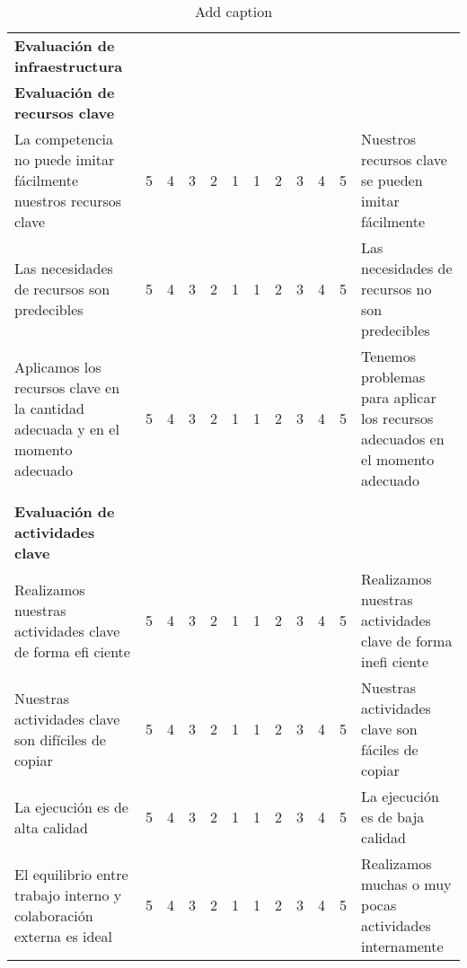\documentclass[11pt]{book}
\begin{document}
\begin{table}[htbp]
  \centering
  \caption{Add caption}
    \begin{tabular}{p{14.285em}ccccc|cccccp{12em}}
    \multicolumn{1}{l}{\textcolor[rgb]{ 1,  0,  0}{\textbf{Evaluación de infraestructura}}} &       &       &       &       & \multicolumn{1}{c}{} &       &       &       &       &       & \multicolumn{1}{r}{} \\
    \multicolumn{1}{l}{\textbf{Evaluación de recursos clave}} &       &       &       &       & \multicolumn{1}{c}{} &       &       &       &       &       & \multicolumn{1}{r}{} \\
    La competencia no puede imitar fácilmente nuestros recursos clave & 5     & 4     & 3     & 2     & 1     & 1     & 2     & 3     & 4     & 5     & Nuestros recursos clave se pueden imitar fácilmente \\
    Las necesidades de recursos son predecibles & 5     & 4     & 3     & 2     & 1     & 1     & 2     & 3     & 4     & 5     & Las necesidades de recursos no son predecibles \\
    Aplicamos los recursos clave en la cantidad adecuada y en el momento adecuado & 5     & 4     & 3     & 2     & 1     & 1     & 2     & 3     & 4     & 5     & Tenemos problemas para aplicar los recursos adecuados en el momento adecuado \\
    \multicolumn{1}{r}{} &       &       &       &       & \multicolumn{1}{c}{} &       &       &       &       &       & \multicolumn{1}{r}{} \\
    \multicolumn{1}{l}{\textbf{Evaluación de actividades clave}} &       &       &       &       & \multicolumn{1}{c}{} &       &       &       &       &       & \multicolumn{1}{r}{} \\
    Realizamos nuestras actividades clave de forma efi ciente & 5     & 4     & 3     & 2     & 1     & 1     & 2     & 3     & 4     & 5     & Realizamos nuestras actividades clave de forma inefi ciente \\
    Nuestras actividades clave son difíciles de copiar & 5     & 4     & 3     & 2     & 1     & 1     & 2     & 3     & 4     & 5     & Nuestras actividades clave son fáciles de copiar \\
    La ejecución es de alta calidad & 5     & 4     & 3     & 2     & 1     & 1     & 2     & 3     & 4     & 5     & La ejecución es de baja calidad \\
    El equilibrio entre trabajo interno y colaboración externa es ideal & 5     & 4     & 3     & 2     & 1     & 1     & 2     & 3     & 4     & 5     & Realizamos muchas o muy pocas actividades internamente \\

\end{tabular}
\end{table}
\end{document}
